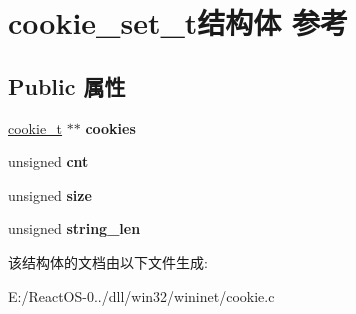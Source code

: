 \hypertarget{structcookie__set__t}{}\section{cookie\+\_\+set\+\_\+t结构体 参考}
\label{structcookie__set__t}
\subsection*{Public 属性}
\begin{DoxyCompactItemize}
\item 
\mbox{\label{structcookie__set__t_a5114ab69535e54ad2731951142765d45}} 
\hyperlink{structcookie__t}{cookie\+\_\+t} $\ast$$\ast$ {\bfseries cookies}
\item 
\mbox{\label{structcookie__set__t_a5da47cf6da4a0d486ceaf67e45525122}} 
unsigned {\bfseries cnt}
\item 
\mbox{\label{structcookie__set__t_a63ee0c2e7b9dfc86e812bb3e721d9182}} 
unsigned {\bfseries size}
\item 
\mbox{\label{structcookie__set__t_a71257329b3f586a69773baf079ba120e}} 
unsigned {\bfseries string\+\_\+len}
\end{DoxyCompactItemize}


该结构体的文档由以下文件生成\+:\begin{DoxyCompactItemize}
\item 
E\+:/\+React\+O\+S-\/0../dll/win32/wininet/cookie.\+c\end{DoxyCompactItemize}
